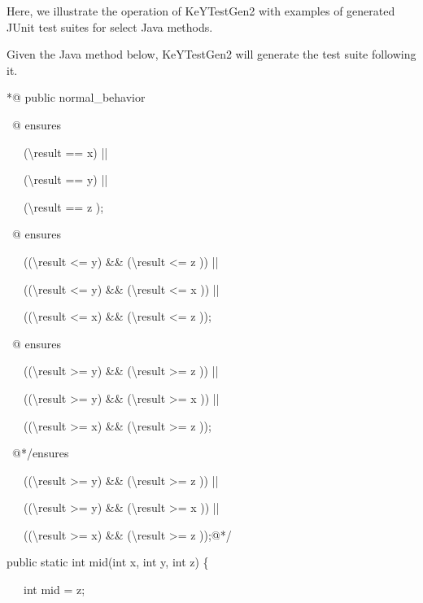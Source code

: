 \documentclass{article}
\newenvironment{tmindent}{\begin{tmparmod}{1.5em}{0pt}{0pt} }{\end{tmparmod}}
\newenvironment{tmparmod}[3]{\begin{list}{}{\setlength{\topsep}{0pt}\setlength{\leftmargin}{#1}\setlength{\rightmargin}{#2}\setlength{\parindent}{#3}\setlength{\listparindent}{\parindent}\setlength{\itemindent}{\parindent}\setlength{\parsep}{\parskip}} \item[]}{\end{list}}
\newenvironment{tmparsep}[1]{\begingroup\setlength{\parskip}{#1}}{\endgroup}
\begin{document}
Here, we illustrate the operation of KeYTestGen2 with examples of generated
JUnit test suites for select Java methods.

\begin{example}
  
  
  
  
  Given the Java method below, KeYTestGen2 will generate the test suite
  following it.
  
  
  
  {\noindent}\begin{tmindent}
    \begin{tmparsep}{0em}
      /*@ public normal\_behavior \ \
      
      \ @ ensures
      
      \ \ \ ({\textbackslash}result == x) ||
      
      \ \ \ ({\textbackslash}result == y) ||
      
      \ \ \ ({\textbackslash}result == z ); \
      
      \ @ ensures
      
      \ \ \ (({\textbackslash}result <= y) \&\& ({\textbackslash}result <= z
      )) ||
      
      \ \ \ (({\textbackslash}result <= y) \&\& ({\textbackslash}result <= x
      )) ||
      
      \ \ \ (({\textbackslash}result <= x) \&\& ({\textbackslash}result <= z
      )); \ \ \ \ \
      
      \ @ ensures
      
      \ \ \ (({\textbackslash}result >= y) \&\& ({\textbackslash}result >= z
      )) ||
      
      \ \ \ (({\textbackslash}result >= y) \&\& ({\textbackslash}result >= x
      )) ||
      
      \ \ \ (({\textbackslash}result >= x) \&\& ({\textbackslash}result >= z
      )); \ \ \ \ \
      
      \ @*/ensures
      
      \ \ \ (({\textbackslash}result >= y) \&\& ({\textbackslash}result >= z
      )) ||
      
      \ \ \ (({\textbackslash}result >= y) \&\& ({\textbackslash}result >= x
      )) ||
      
      \ \ \ (({\textbackslash}result >= x) \&\& ({\textbackslash}result >= z
      ));@*/
      
      public static int mid(int x, int y, int z) \{
      
      \ \ \ int mid = z;
      

\end{tmparsep}
\end{tmindent}
\end{example}
\end{document}
